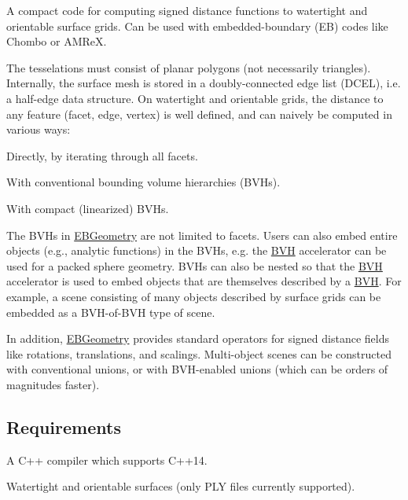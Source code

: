 A compact code for computing signed distance functions to watertight and orientable surface grids. Can be used with embedded-\/boundary (EB) codes like Chombo or A\+M\+ReX.

The tesselations must consist of planar polygons (not necessarily triangles). Internally, the surface mesh is stored in a doubly-\/connected edge list (D\+C\+EL), i.\+e. a half-\/edge data structure. On watertight and orientable grids, the distance to any feature (facet, edge, vertex) is well defined, and can naively be computed in various ways\+:


\begin{DoxyItemize}
\item Directly, by iterating through all facets.
\item With conventional bounding volume hierarchies (B\+V\+Hs).
\item With compact (linearized) B\+V\+Hs.
\end{DoxyItemize}

The B\+V\+Hs in \hyperlink{namespaceEBGeometry}{E\+B\+Geometry} are not limited to facets. Users can also embed entire objects (e.\+g., analytic functions) in the B\+V\+Hs, e.\+g. the \hyperlink{namespaceBVH}{B\+VH} accelerator can be used for a packed sphere geometry. B\+V\+Hs can also be nested so that the \hyperlink{namespaceBVH}{B\+VH} accelerator is used to embed objects that are themselves described by a \hyperlink{namespaceBVH}{B\+VH}. For example, a scene consisting of many objects described by surface grids can be embedded as a B\+V\+H-\/of-\/\+B\+VH type of scene.



In addition, \hyperlink{namespaceEBGeometry}{E\+B\+Geometry} provides standard operators for signed distance fields like rotations, translations, and scalings. Multi-\/object scenes can be constructed with conventional unions, or with B\+V\+H-\/enabled unions (which can be orders of magnitudes faster).

\subsection*{Requirements }


\begin{DoxyItemize}
\item A C++ compiler which supports C++14.
\item Watertight and orientable surfaces (only P\+LY files currently supported).
\end{DoxyItemize}

